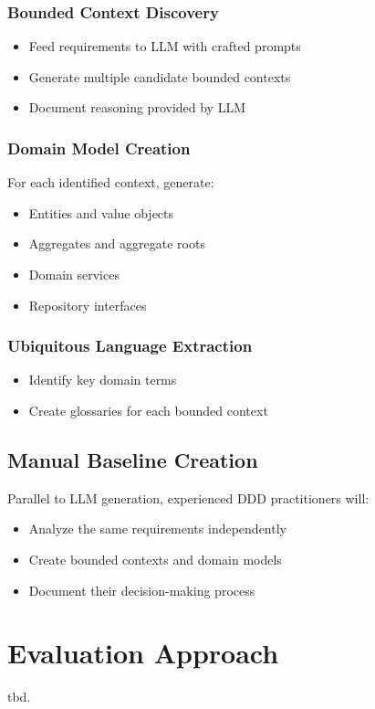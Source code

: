 \subsubsection{Bounded Context Discovery}
\begin{itemize}
    \item Feed requirements to LLM with crafted prompts
    \item Generate multiple candidate bounded contexts
    \item Document reasoning provided by LLM
\end{itemize}

\subsubsection{Domain Model Creation}
For each identified context, generate:
\begin{itemize}
    \item Entities and value objects
    \item Aggregates and aggregate roots
    \item Domain services
    \item Repository interfaces
\end{itemize}

\subsubsection{Ubiquitous Language Extraction}
\begin{itemize}
    \item Identify key domain terms
    \item Create glossaries for each bounded context
\end{itemize}

\subsection{Manual Baseline Creation}

Parallel to LLM generation, experienced DDD practitioners will:
\begin{itemize}
    \item Analyze the same requirements independently
    \item Create bounded contexts and domain models
    \item Document their decision-making process
\end{itemize}

\section{Evaluation Approach}
tbd.